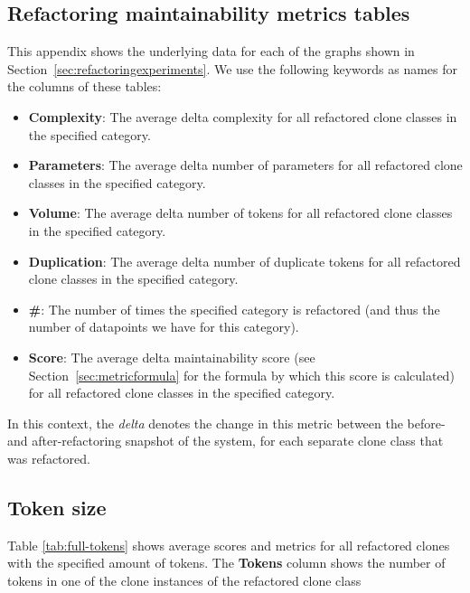 \begin{appendices}

	\chapter{Refactoring maintainability metrics tables}
	This appendix shows the underlying data for each of the graphs shown in Section~\ref{sec:refactoringexperiments}. We use the following keywords as names for the columns of these tables:
	\begin{itemize}
		\item \textbf{Complexity}: The average delta complexity for all refactored clone classes in the specified category.
		\item \textbf{Parameters}: The average delta number of parameters for all refactored clone classes in the specified category.
		\item \textbf{Volume}: The average delta number of tokens for all refactored clone classes in the specified category.
		\item \textbf{Duplication}: The average delta number of duplicate tokens for all refactored clone classes in the specified category.
		\item \textbf{\#}: The number of times the specified category is refactored (and thus the number of datapoints we have for this category).
		\item \textbf{Score}: The average delta maintainability score (see Section~\ref{sec:metricformula} for the formula by which this score is calculated) for all refactored clone classes in the specified category.
	\end{itemize}
	In this context, the \textit{delta} denotes the change in this metric between the before- and after-refactoring snapshot of the system, for each separate clone class that was refactored.

	\section{Token size}
Table \ref{tab:full-tokens} shows average scores and metrics for all refactored clones with the specified amount of tokens. The \textbf{Tokens} column shows the number of tokens in one of the clone instances of the refactored clone class


\end{appendices}
